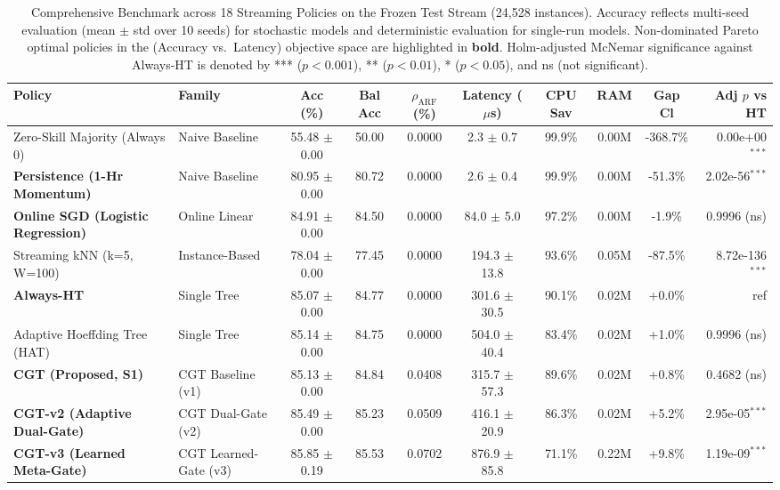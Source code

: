\begin{table}[t]
\centering
\caption{Comprehensive Benchmark across 18 Streaming Policies on the Frozen Test Stream (24,528 instances). Accuracy reflects multi-seed evaluation (mean $\pm$ std over 10 seeds) for stochastic models and deterministic evaluation for single-run models. Non-dominated Pareto optimal policies in the (Accuracy vs.\ Latency) objective space are highlighted in \textbf{bold}. Holm-adjusted McNemar significance against Always-HT is denoted by *** ($p < 0.001$), ** ($p < 0.01$), * ($p < 0.05$), and ns (not significant).}
\label{tab:final_results}
\small
\begin{tabular}{llcccccccr}
\toprule
\textbf{Policy} & \textbf{Family} & \textbf{Acc (\%)} & \textbf{Bal Acc} & \textbf{$\rho_{\text{ARF}}$ (\%)} & \textbf{Latency ($\mu$s)} & \textbf{CPU Sav} & \textbf{RAM} & \textbf{Gap Cl} & \textbf{Adj $p$ vs HT} \\
\midrule
Zero-Skill Majority (Always 0) & Naive Baseline & 55.48 $\pm$ 0.00 & 50.00 & 0.0000 & 2.3 $\pm$ 0.7 & 99.9\% & 0.00M & -368.7\% & 0.00e+00$^{***}$ \\
\textbf{Persistence (1-Hr Momentum)} & Naive Baseline & 80.95 $\pm$ 0.00 & 80.72 & 0.0000 & 2.6 $\pm$ 0.4 & 99.9\% & 0.00M & -51.3\% & 2.02e-56$^{***}$ \\
\textbf{Online SGD (Logistic Regression)} & Online Linear & 84.91 $\pm$ 0.00 & 84.50 & 0.0000 & 84.0 $\pm$ 5.0 & 97.2\% & 0.00M & -1.9\% & 0.9996 (ns) \\
Streaming kNN (k=5, W=100) & Instance-Based & 78.04 $\pm$ 0.00 & 77.45 & 0.0000 & 194.3 $\pm$ 13.8 & 93.6\% & 0.05M & -87.5\% & 8.72e-136$^{***}$ \\
\textbf{Always-HT} & Single Tree & 85.07 $\pm$ 0.00 & 84.77 & 0.0000 & 301.6 $\pm$ 30.5 & 90.1\% & 0.02M & +0.0\% & ref \\
Adaptive Hoeffding Tree (HAT) & Single Tree & 85.14 $\pm$ 0.00 & 84.75 & 0.0000 & 504.0 $\pm$ 40.4 & 83.4\% & 0.02M & +1.0\% & 0.9996 (ns) \\
\textbf{CGT (Proposed, S1)} & CGT Baseline (v1) & 85.13 $\pm$ 0.00 & 84.84 & 0.0408 & 315.7 $\pm$ 57.3 & 89.6\% & 0.02M & +0.8\% & 0.4682 (ns) \\
\textbf{CGT-v2 (Adaptive Dual-Gate)} & CGT Dual-Gate (v2) & 85.49 $\pm$ 0.00 & 85.23 & 0.0509 & 416.1 $\pm$ 20.9 & 86.3\% & 0.02M & +5.2\% & 2.95e-05$^{***}$ \\
\textbf{CGT-v3 (Learned Meta-Gate)} & CGT Learned-Gate (v3) & 85.85 $\pm$ 0.19 & 85.53 & 0.0702 & 876.9 $\pm$ 85.8 & 71.1\% & 0.22M & +9.8\% & 1.19e-09$^{***}$ \\

\end{tabular}
\end{table}

